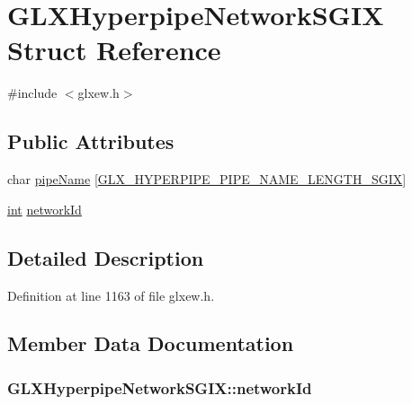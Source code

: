 \hypertarget{struct_g_l_x_hyperpipe_network_s_g_i_x}{\section{G\-L\-X\-Hyperpipe\-Network\-S\-G\-I\-X Struct Reference}
\label{struct_g_l_x_hyperpipe_network_s_g_i_x}
}


{\ttfamily \#include $<$glxew.\-h$>$}

\subsection*{Public Attributes}
\begin{DoxyCompactItemize}
\item 
char \hyperlink{struct_g_l_x_hyperpipe_network_s_g_i_x_a6338b9717fa895aec16b932f2ef693ed}{pipe\-Name} \mbox{[}\hyperlink{glxew_8h_ae1c8261c0861010d8003a31d07e26005}{G\-L\-X\-\_\-\-H\-Y\-P\-E\-R\-P\-I\-P\-E\-\_\-\-P\-I\-P\-E\-\_\-\-N\-A\-M\-E\-\_\-\-L\-E\-N\-G\-T\-H\-\_\-\-S\-G\-I\-X}\mbox{]}
\item 
\hyperlink{wglew_8h_a500a82aecba06f4550f6849b8099ca21}{int} \hyperlink{struct_g_l_x_hyperpipe_network_s_g_i_x_a81393053988b32fadb0b21615024add1}{network\-Id}
\end{DoxyCompactItemize}


\subsection{Detailed Description}


Definition at line 1163 of file glxew.\-h.



\subsection{Member Data Documentation}
\hypertarget{struct_g_l_x_hyperpipe_network_s_g_i_x_a81393053988b32fadb0b21615024add1}{
\subsubsection[{network\-Id}]{ G\-L\-X\-Hyperpipe\-Network\-S\-G\-I\-X\-::network\-Id}}\label{struct_g_l_x_hyperpipe_network_s_g_i_x_a81393053988b32fadb0b21615024add1}


